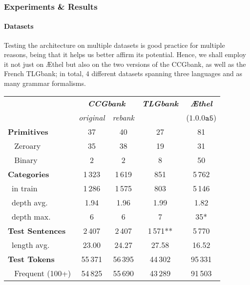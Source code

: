 \subsubsection{Experiments \& Results}
\paragraph{Datasets}
Testing the architecture on multiple datasets is good practice for multiple reasons,  being that it helps us better affirm its potential.
Hence, we shall employ it not just on \AE thel but also on the two versions of the CCGbank, as well as the French TLGbank; in total, 4 different datasets spanning three languages and as many grammar formalisms.

\begin{table}
    \centering
    \small{
    \begin{tabular}{@{}l@{\qquad}c@{\quad}c@{\qquad}c@{\qquad}c@{}}
        & \multicolumn{2}{c}{\textbf{\textit{CCGbank}}} 
        & \textbf{\textit{TLGbank}}
        & \textbf{\textit{\AE thel}}\\ 
        & \textit{original} & \textit{rebank} & & ($\mathtt{1.0.0a5}$)\\
        \toprule
        \textbf{Primitives}     & 37        & 40        & 27        & 81\\
        ~ Zeroary           & 35        & 38        & 19        & 31\\ 
        ~ Binary            & 2         & 2         & 8         & 50\\
        \midrule
        \textbf{Categories}     & 1\,323      & 1\,619      & 851      & 5\,762\\
        ~{in train}         & 1\,286      & 1\,575      & 803      & 5\,146\\
        ~{depth avg.}       & 1.94      & 1.96      & 1.99     &   1.82\\
        ~{depth max.}       & 6         & 6         & 7        & 35*\\ 
        \midrule
        \textbf{Test Sentences} & 2\,407      & 2\,407      & 1\,571**    & 5\,770 \\
        ~{length avg.}      & 23.00     & 24.27     & 27.58    &  16.52\\
        \midrule
        \textbf{Test Tokens}    & 55\,371     & 56\,395     & 44\,302     & 95\,331\\
        ~ Frequent {(100+)}   & 54\,825     & 55\,690     & 43\,289     & 91\,503\\

\end{tabular}}
\end{table}
